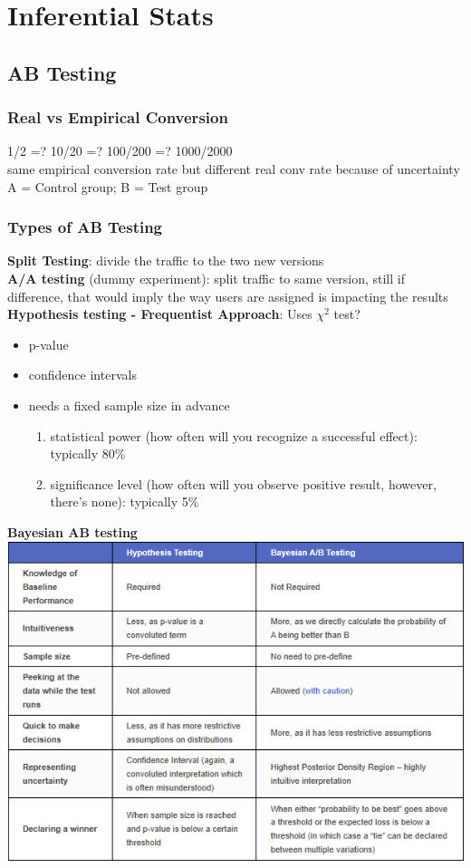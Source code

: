 \documentclass{beamer}
\begin{document}


\section{Inferential Stats}


\subsection{AB Testing}

\begin{frame}\frametitle{Real vs Empirical Conversion}
	1/2 =? 10/20 =? 100/200 =? 1000/2000\\
	same empirical conversion rate but different real conv rate because of uncertainty\\
	A = Control group; B = Test group\\
\end{frame}


\begin{frame}[allowframebreaks]\frametitle{Types of AB Testing}
\textbf{Split Testing}: divide the traffic to the two new versions\\
\textbf{A/A testing} (dummy experiment): 
split traffic to same version, still if difference, that would imply the way users are assigned is impacting the results\\
\textbf{Hypothesis testing - Frequentist Approach}:
Uses $\chi^2$ test?\\
\begin{itemize}
	\item p-value
	\item confidence intervals
	\item needs a fixed sample size in advance
	\begin{enumerate}
		\item statistical power (how often will you recognize a successful effect): typically 80\%
		\item significance level (how often will you observe positive result, however, there's none): typically 5\%
	\end{enumerate}
\end{itemize}
\textbf{Bayesian AB testing}\\
\includegraphics[scale=0.5]{figs/hypothesisBayesian}
\end{frame}
\end{document}
